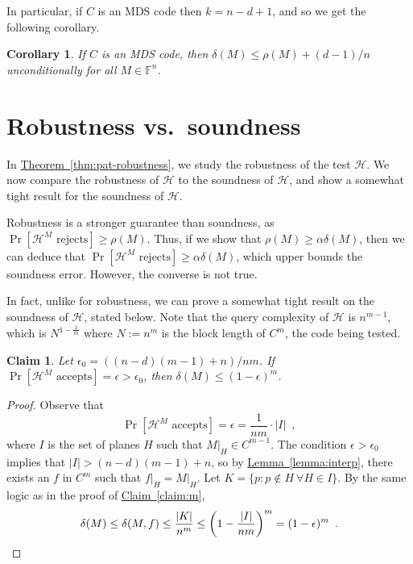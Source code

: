 \documentclass[11pt]{article}
\numberwithin{equation}{section}
\newtheorem{corollary}[theorem]{Corollary}
\newtheorem{claim}[theorem]{Claim}
\theoremstyle{definition}
\theoremstyle{plain}
\newcommand{\expref}[2]{\hyperref[#2]{#1~\ref{#2}}}
\theoremstyle{plain}
\newcommand{\colored}{}
\newcommand{\reldist}{\colored{\delta}}
\newcommand{\robust}{\colored{\rho}} %
\newcommand{\tester}{\colored{\mathcal H}} %
\newcommand{\plane}{{\colored{H}}} %
\newcommand{\codedist}{\colored{d}} %
\newcommand{\blocklength}{\colored{n}} %
\newcommand{\testerinput}{\colored{M}} %
\newcommand{\closestglobalword}{\colored{f}} %
\newcommand{\Field}{\colored{\mathbb F}}
\newcommand{\DefineEqual}{:=}
\newcommand\abs[1]{\colored{\left|#1\right|}}
\begin{document}
In particular, if $C$ is an MDS code then $k = \blocklength - \codedist + 1$, and so we get the following corollary.

\begin{corollary}
\label{cor:robustness-of-RS}
If $C$ is an MDS code, then $\reldist(\testerinput) \leq \robust(\testerinput) +  (\codedist-1)/\blocklength$ unconditionally for all $\testerinput \in \Field^{\blocklength}$.
\end{corollary}


%
%
%
\section{Robustness vs.\ soundness}
\label{sec:soundness}

In \expref{Theorem}{thm:pat-robustness}, we study the robustness of the test $\tester$. We now compare the robustness of $\tester$ to the soundness of $\tester$, and show a somewhat tight result for the soundness of $\tester$.

Robustness is a stronger guarantee than soundness, as $\Pr[\tester^{\testerinput} \text{ rejects}] \geq \robust(\testerinput)$. Thus, if we show that $\robust(\testerinput) \geq \alpha \reldist(\testerinput)$, then we can deduce that $\Pr[\tester^{\testerinput}\text{ rejects}] \geq \alpha \reldist(\testerinput)$, which upper bounds the soundness error. However, the converse is not true.

In fact, unlike for robustness, we can prove a somewhat tight result on the soundness of $\tester$, stated below. Note that the query complexity of $\tester$ is $\blocklength^{m-1}$, which is $N^{1 - \frac{1}{m}}$ where $N \DefineEqual \blocklength^m$ is the block length of $C^{m}$, the code being tested.

%

\begin{claim}
\label{claim:accprob}
Let $\epsilon_0 = ((\blocklength - \codedist)(m-1) + \blocklength )/\blocklength m$. If $\Pr[\tester^{\testerinput} \text{ accepts}] = \epsilon > \epsilon_0$, then $\reldist(\testerinput) \leq (1 - \epsilon)^m$.
\end{claim}
\begin{proof}
  Observe that
  \[
    \Pr[\tester^{\testerinput} \text{ accepts}] = \epsilon = \frac{1}{\blocklength m} \cdot \abs{I}\enspace,
  \]
  where $I$ is the set of planes $\plane$ such that $\testerinput \vert_{\plane} \in C^{m-1}$. The condition $\epsilon > \epsilon_0$ implies that $\abs{I} > (\blocklength - \codedist)(m-1) + \blocklength$, so by \expref{Lemma}{lemma:interp}, there exists an $\closestglobalword$ in $C^m$ such that $\closestglobalword \vert_{\plane} = \testerinput \vert_{\plane}$. Let $K = \{p : p \notin \plane \ \forall \plane \in I\}$. By the same logic as in the proof of \expref{Claim}{claim:m},
\begin{equation*}
\reldist(\testerinput) \leq \reldist(\testerinput, f) \leq \frac{\abs{K}}{\blocklength^m} \leq \left(1 - \frac{\abs{I}}{\blocklength m} \right)^m = (1 - \epsilon)^m \enspace. \qedhere
\end{equation*}
\end{proof}
\end{document}

